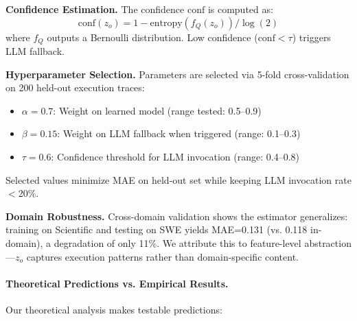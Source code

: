 \documentclass{article}
\theoremstyle{plain}
\theoremstyle{definition}
\theoremstyle{remark}
\begin{document}
\textbf{Confidence Estimation.} The confidence $\text{conf}$ is computed as:
\begin{equation}
	\text{conf}(z_o) = 1 - \text{entropy}(f_Q(z_o)) / \log(2)
\end{equation}
where $f_Q$ outputs a Bernoulli distribution. Low confidence ($\text{conf} < \tau$) triggers LLM fallback.

\textbf{Hyperparameter Selection.} Parameters are selected via 5-fold cross-validation on 200 held-out execution traces:
\begin{itemize}[nosep,leftmargin=*]
	\item $\alpha = 0.7$: Weight on learned model (range tested: 0.5--0.9)
	\item $\beta = 0.15$: Weight on LLM fallback when triggered (range: 0.1--0.3)
	\item $\tau = 0.6$: Confidence threshold for LLM invocation (range: 0.4--0.8)
\end{itemize}
Selected values minimize MAE on held-out set while keeping LLM invocation rate $<$20\%.

\textbf{Domain Robustness.} Cross-domain validation shows the estimator generalizes: training on Scientific and testing on SWE yields MAE=0.131 (vs. 0.118 in-domain), a degradation of only 11\%. We attribute this to feature-level abstraction---$z_o$ captures execution patterns rather than domain-specific content.

\paragraph{Theoretical Predictions vs. Empirical Results.}

Our theoretical analysis makes testable predictions:





\end{document}
